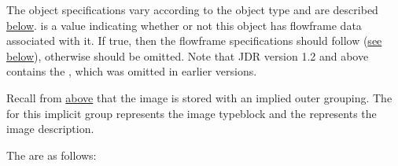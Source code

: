 \begin{numbered}
The object specifications  vary according to the
object type and are described \hyperref[jdr:objectspecs]{below}.
 is a  value indicating whether or not
this object has flowframe data associated with it. If true, then the
flowframe specifications  should follow
(\hyperref[jdr:flowframe]{see below}), otherwise
 should be omitted. Note that JDR version 1.2
and above contains the  , which was
omitted in earlier versions.

Recall from \hyperref[jdr:object]{above} that the image is stored with an implied outer grouping. The
 for this implicit group represents the image
\gls{typeblock} and the  represents the image description.

\end{numbered}

The  are as follows:

